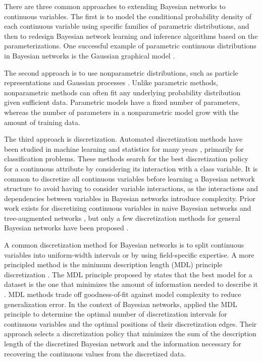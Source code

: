 There are three common approaches to extending Bayesian networks to continuous variables.
The first is to model the conditional probability density of each continuous variable using specific families of parametric distributions, and then to redesign Bayesian network learning and inference algorithms based on the parameterizations.
One successful example of parametric continuous distributions in Bayesian networks is the Gaussian graphical model \citep{Weiss_2011}.

The second approach is to use nonparametric distributions, such as particle representations and Gaussian processes \citep{Ickstadt_2010}.
Unlike parametric methods, nonparametric methods can often fit any underlying probability distribution given sufficient data.
Parametric models have a fixed number of parameters, whereas the number of parameters in a nonparametric model grow with the amount of training data.

The third approach is discretization.
Automated discretization methods have been studied in machine learning and statistics for many years \citep{Dougherty_1995, Kerber_1992, Holte_1993, Fayyad_1993}, primarily for classification problems.
These methods search for the best discretization policy for a continuous attribute by considering its interaction with a class variable.
It is common to discretize all continuous variables before learning a Bayesian network structure to avoid having to consider variable interactions, as the interactions and dependencies between variables in Bayesian networks introduce complexity.
Prior work exists for discretizing continuous variables in naive Bayesian networks and tree-augmented networks \citep{Fried_naive}, but only a few discretization methods for general Bayesian networks have been proposed \citep{Friedman_1996, Kozlov_1997, Monti_1998, Steck_2007}.


A common discretization method for Bayesian networks is to split continuous variables into uniform-width intervals or by using field-specific expertise.
A more principled method is the minimum description length (MDL) principle discretization \citep{Friedman_1996}.
The MDL principle proposed by \cite{MDL_1978} states that the best model for a dataset is the one that minimizes the amount of information needed to describe it \citep{Grunwald_2009}.
MDL methods trade off goodness-of-fit against model complexity to reduce generalization error.
In the context of Bayesian networks, \cite{Friedman_1996} applied the MDL principle to determine the optimal number of discretization intervals for continuous variables and the optimal positions of their discretization edges.
Their approach selects a discretization policy that minimizes the sum of the description length of the discretized Bayesian network and the information necessary for recovering the continuous values from the discretized data.

